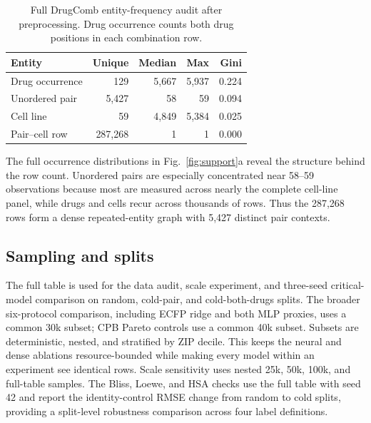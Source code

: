 \documentclass[conference]{IEEEtran}
\begin{document}
\begin{table}[!t]
\centering
\caption{Full DrugComb entity-frequency audit after preprocessing. Drug occurrence counts both drug positions in each combination row.}
\label{tab:frequency}
\begin{tabular}{lrrrr}
\toprule
Entity & Unique & Median & Max & Gini \\
\midrule
Drug occurrence & 129 & 5,667 & 5,937 & 0.224 \\
Unordered pair & 5,427 & 58 & 59 & 0.094 \\
Cell line & 59 & 4,849 & 5,384 & 0.025 \\
Pair--cell row & 287,268 & 1 & 1 & 0.000 \\
\bottomrule
\end{tabular}
\end{table}

The full occurrence distributions in Fig.~\ref{fig:support}a reveal the structure behind the row count. Unordered pairs are especially concentrated near 58--59 observations because most are measured across nearly the complete cell-line panel, while drugs and cells recur across thousands of rows. Thus the 287,268 rows form a dense repeated-entity graph with 5,427 distinct pair contexts.

\subsection{Sampling and splits}

The full table is used for the data audit, scale experiment, and three-seed critical-model comparison on random, cold-pair, and cold-both-drugs splits. The broader six-protocol comparison, including ECFP ridge and both MLP proxies, uses a common 30k subset; CPB Pareto controls use a common 40k subset. Subsets are deterministic, nested, and stratified by ZIP decile. This keeps the neural and dense ablations resource-bounded while making every model within an experiment see identical rows. Scale sensitivity uses nested 25k, 50k, 100k, and full-table samples. The Bliss, Loewe, and HSA checks use the full table with seed 42 and report the identity-control RMSE change from random to cold splits, providing a split-level robustness comparison across four label definitions.
\end{document}
